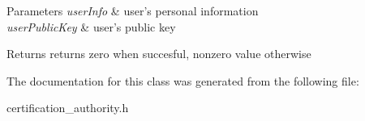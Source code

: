 \begin{DoxyParams}{Parameters}
{\em user\-Info} & user's personal information \\
\hline
{\em user\-Public\-Key} & user's public key\\
\hline
\end{DoxyParams}
\begin{DoxyReturn}{Returns}
returns zero when succesful, nonzero value otherwise 
\end{DoxyReturn}


The documentation for this class was generated from the following file\-:\begin{DoxyCompactItemize}
\item 
certification\-\_\-authority.\-h\end{DoxyCompactItemize}
